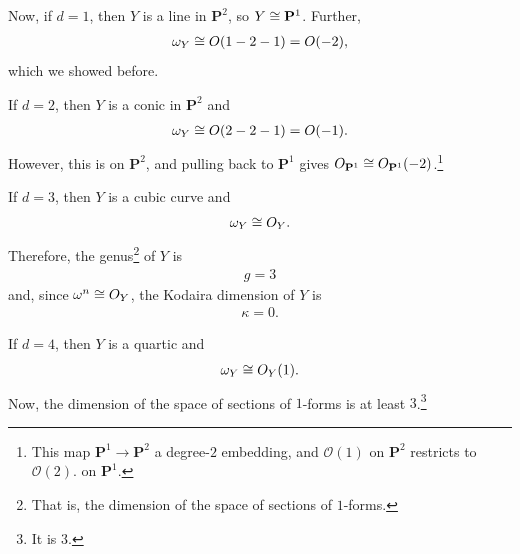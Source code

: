 \documentclass [11 pt, oneside] {article}
\begin{document}
\begin{example}[$n=2$]\label{}\text{}
Now, if $d=1$, then $Y$ is a line in $\mathbf{P}^2$, so $Y\cong \mathbf{P}^1$. Further,
\begin{align*}
	\omega_Y \cong \relax{O}(1-2-1)=  \relax{O}(-2),
\end{align*}
which we showed before. 

If $d=2$, then $Y$ is a conic in $\mathbf{P}^2$ and 
\begin{align*}
	\omega_Y \cong \relax{O}(2-2-1) =  \relax{O}(-1).
\end{align*}
However, this is on $\mathbf{P}^2$, and pulling back to $\mathbf{P}^1$ gives $\relax{O}_{\mathbf{P}^1} \cong \relax{O}_{\mathbf{P}^1}(-2)$.\footnote{This map $\mathbf{P}^1\longrightarrow \mathbf{P}^2$ a degree-$2$ embedding, and $\mathscr{O}(1)$ on $\mathbf{P}^2$ restricts to $\mathscr{O}(2)$. on $\mathbf{P}^1$.}

If $d=3$, then $Y$ is a cubic curve and 
\begin{align*}
	\omega_Y \cong \relax{O}_Y.
\end{align*}
Therefore, the genus\footnote{That is, the dimension of the space of sections of $1$-forms.} of $Y$ is
\begin{align*}
	g = 3
\end{align*}
and, since $\omega^n \cong \relax{O}_Y$, the Kodaira dimension of $Y$ is
\begin{align*}
	\kappa = 0.
\end{align*}
\end{example}

If $d=4$, then $Y$ is a quartic and 
\begin{align*}
	\omega_Y \cong \relax{O}_Y(1).
\end{align*}
Now, the dimension of the space of sections of $1$-forms is at least $3$.\footnote{It is $3$.} 
\end{document}
